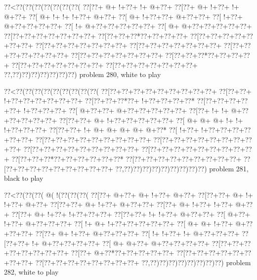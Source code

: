 \vbox{\vbox{\goo
\0??<\0??(\0??(\0??(\0??(\0??(\0??(\0??(
\0??[\0??+\- @+\- !+\0??+\- !+\- @+\0??+
\0??[\0??+\- @+\- !+\0??+\- !+\- @+\0??+
\0??[\- @+\- !+\- !+\- !+\0??+\- @+\0??+
\0??[\- @+\- !+\0??+\0??+\- @+\0??+\0??+
\0??[\- !+\0??+\- @+\0??+\0??+\0??+\0??+
\0??[\- !+\- @+\0??+\0??+\0??+\0??+\0??+
\0??[\- @+\- @+\0??+\0??+\0??+\0??+\0??+
\0??[\0??+\0??+\0??+\0??+\0??+\0??+\0??+
\0??[\0??+\0??+\0??*\0??+\0??+\0??+\0??+
\0??[\0??+\0??+\0??+\0??+\0??+\0??+\0??+
\0??[\0??+\0??+\0??+\0??+\0??+\0??+\0??+
\0??[\0??+\0??+\0??+\0??+\0??+\0??+\0??+
\0??[\0??+\0??+\0??+\0??+\0??+\0??+\0??+
\0??[\0??+\0??+\0??+\0??+\0??+\0??+\0??+
\0??[\0??+\0??+\0??*\0??+\0??+\0??+\0??+
\0??[\0??+\0??+\0??+\0??+\0??+\0??+\0??+
\0??[\0??+\0??+\0??+\0??+\0??+\0??+\0??+
\0??,\0??)\0??)\0??)\0??)\0??)\0??)\0??)
}
\hfil problem 280, white to play\hfil\break
}

\vbox{\vbox{\goo
\0??<\0??(\0??(\0??(\0??(\0??(\0??(\0??(\0??(\0??(
\0??[\0??+\0??+\0??+\0??+\0??+\0??+\0??+\0??+\0??+
\0??[\0??+\0??+\- !+\0??+\0??+\0??+\0??+\0??+\0??+
\0??[\0??+\0??+\0??*\0??+\- !+\0??+\0??+\0??+\0??*
\0??[\0??+\0??+\0??+\0??+\0??+\- !+\0??+\0??+\0??+
\0??[\- @+\0??+\0??+\- @+\0??+\0??+\0??+\0??+\0??+
\0??[\0??+\- !+\- !+\- @+\0??+\0??+\0??+\0??+\0??+
\0??[\0??+\0??+\- @+\- !+\0??+\0??+\0??+\0??+\0??+
\0??[\- @+\- @+\- @+\- !+\- !+\- !+\0??+\0??+\0??+
\0??[\0??+\0??+\- !+\- @+\- @+\- @+\- @+\- @+\0??*
\0??[\- !+\0??+\- !+\0??+\0??+\0??+\0??+\0??+\0??+
\0??[\0??+\0??+\0??+\0??+\0??+\0??+\0??+\0??+\0??+
\0??[\0??+\0??+\0??+\0??+\0??+\0??+\0??+\0??+\0??+
\0??[\0??+\0??+\0??+\0??+\0??+\0??+\0??+\0??+\0??+
\0??[\0??+\0??+\0??+\0??+\0??+\0??+\0??+\0??+\0??+
\0??[\0??+\0??+\0??*\0??+\0??+\0??+\0??+\0??+\0??*
\0??[\0??+\0??+\0??+\0??+\0??+\0??+\0??+\0??+\0??+
\0??[\0??+\0??+\0??+\0??+\0??+\0??+\0??+\0??+\0??+
\0??,\0??)\0??)\0??)\0??)\0??)\0??)\0??)\0??)\0??)
}
\hfil problem 281, black to play\hfil\break
}

\vbox{\vbox{\goo
\0??<\0??(\0??(\0??(\- @(\- !(\0??(\0??(\0??(
\0??[\0??+\- @+\0??+\- @+\- !+\0??+\- @+\0??+
\0??[\0??+\0??+\- @+\- !+\- !+\0??+\- @+\0??+
\0??[\0??+\0??+\- @+\- !+\0??+\- @+\0??+\0??+
\0??[\0??+\- @+\- !+\0??+\- !+\0??+\- @+\0??+
\0??[\0??+\- @+\- !+\0??+\- !+\0??+\0??+\0??+
\0??[\0??+\0??+\- !+\- !+\0??+\- @+\0??+\0??+
\0??[\- @+\0??+\- !+\0??+\- @+\0??+\0??+\0??+
\0??[\- !+\- @+\- !+\0??+\0??+\0??+\0??+\0??+
\0??[\- @+\- @+\- !+\0??+\- @+\0??+\0??+\0??+
\0??[\0??+\- @+\- !+\0??+\- @+\0??+\0??+\0??+
\0??[\- !+\- !+\0??+\- !+\- @+\0??+\0??+\0??+
\0??[\0??+\0??+\- !+\- @+\0??+\0??+\0??+\0??+
\0??[\- @+\- @+\0??+\- @+\0??+\0??+\0??+\0??+
\0??[\0??+\0??+\0??+\0??+\0??+\0??+\0??+\0??+
\0??[\0??+\- @+\0??*\0??+\0??+\0??+\0??+\0??+
\0??[\0??+\0??+\0??+\0??+\0??+\0??+\0??+\0??+
\0??[\0??+\0??+\0??+\0??+\0??+\0??+\0??+\0??+
\0??,\0??)\0??)\0??)\0??)\0??)\0??)\0??)\0??)
}
\hfil problem 282, white to play\hfil\break
}

